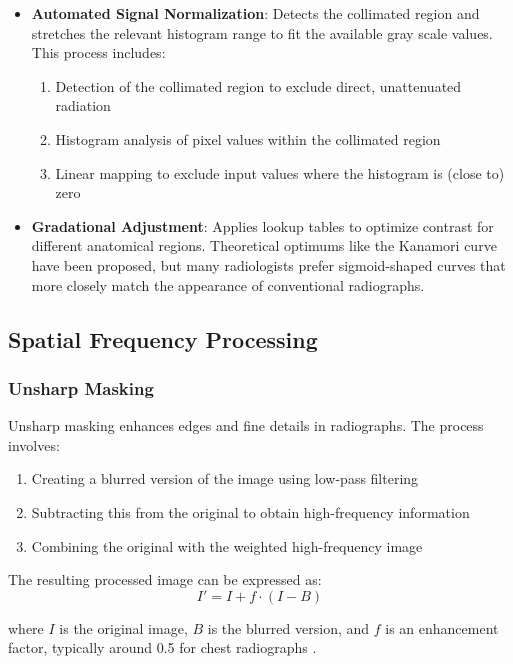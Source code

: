 \documentclass[nomenclature, english, bibtex]{kththesis}
\numberwithin{listing}{chapter}
\begin{document}
\begin{itemize}
    \item \textbf{Automated Signal Normalization}: Detects the collimated region and stretches the relevant histogram range to fit the available gray scale values. This process includes:
    \begin{enumerate}
        \item Detection of the collimated region to exclude direct, unattenuated radiation
        \item Histogram analysis of pixel values within the collimated region
        \item Linear mapping to exclude input values where the histogram is (close to) zero
    \end{enumerate}

    \item \textbf{Gradational Adjustment}: Applies lookup tables to optimize contrast for different anatomical regions. Theoretical optimums like the Kanamori curve \cite{kanamori1966determination} have been proposed, but many radiologists prefer sigmoid-shaped curves that more closely match the appearance of conventional radiographs.
\end{itemize}

\subsection{Spatial Frequency Processing}
\subsubsection{Unsharp Masking}
Unsharp masking enhances edges and fine details in radiographs. The process involves:
\begin{enumerate}
    \item Creating a blurred version of the image using low-pass filtering
    \item Subtracting this from the original to obtain high-frequency information
    \item Combining the original with the weighted high-frequency image
\end{enumerate}

The resulting processed image can be expressed as:
\begin{equation}
I' = I + f \cdot (I - B)
\end{equation}

where $I$ is the original image, $B$ is the blurred version, and $f$ is an enhancement factor, typically around 0.5 for chest radiographs \cite{prokop2003principles}.
\end{document}
